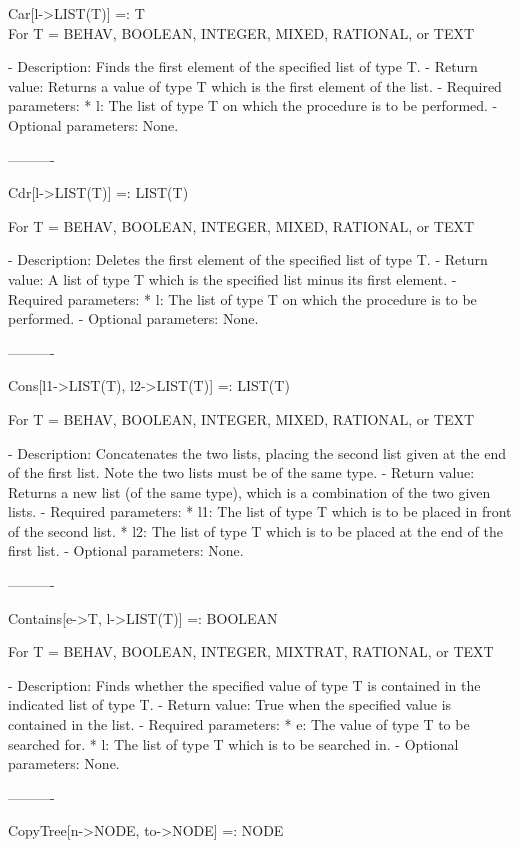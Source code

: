 Car[l->LIST(T)] =: T	\\


	For T = BEHAV, BOOLEAN, INTEGER, MIXED, RATIONAL, or TEXT

   -	Description:  Finds the first element of the specified list of type T.
   -	Return value:  Returns a value of type T which is the first element of 
	the list.
   -	Required parameters:
	  *  l:  The list of type T on which the procedure is to be performed.
   -	Optional parameters:  None.

----------

Cdr[l->LIST(T)] =: LIST(T)

	For T = BEHAV, BOOLEAN, INTEGER, MIXED, RATIONAL, or TEXT

   -	Description:  Deletes the first element of the specified list of type 
	T.
   -	Return value:  A list of type T which is the specified list minus its
	first element.
   -	Required parameters:
	  *  l:  The list of type T on which the procedure is to be performed.
   -	Optional parameters:  None.

----------

Cons[l1->LIST(T), l2->LIST(T)] =: LIST(T)

	For T = BEHAV, BOOLEAN, INTEGER, MIXED, RATIONAL, or TEXT

   -	Description:  Concatenates the two lists, placing the second list given
	at the end of the first list.  Note the two lists must be of the same
	type.
   -	Return value:  Returns a new list (of the same type), which is a 
	combination of the two given lists.
   -	Required parameters:
	  *  l1:  The list of type T which is to be placed in front of the
		second list.
	  *  l2:  The list of type T which is to be placed at the end of the
		first list.
   -	Optional parameters:  None.

----------

Contains[e->T, l->LIST(T)] =: BOOLEAN

	For T = BEHAV, BOOLEAN, INTEGER, MIXTRAT, RATIONAL, or TEXT

   -	Description:  Finds whether the specified value of type T is contained 
	in the indicated list of type T.
   -	Return value:  True when the specified value is contained in the list.
   -	Required parameters:
	  *  e:  The value of type T to be searched for.
	  *  l:  The list of type T which is to be searched in.
   -	Optional parameters:  None.

----------

CopyTree[n->NODE, to->NODE] =: NODE

